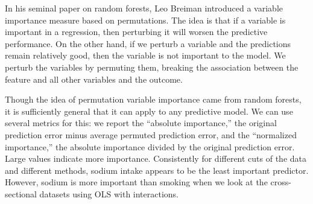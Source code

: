 \documentclass[11pt]{article}\usepackage[]{graphicx}\usepackage[]{color}
\begin{document}
In his seminal paper on random forests, Leo Breiman introduced a variable importance measure based on permutations. 
The idea is that if a variable is important in a regression, then perturbing it will worsen the predictive performance. 
On the other hand, if we perturb a variable and the predictions remain relatively good, then the variable is not important to the model. 
We perturb the variables by permuting them, breaking the association between the feature and all other variables and the outcome.

Though the idea of permutation variable importance came from random forests, it is sufficiently general that it can apply to any predictive model. 
We can use several metrics for this: 
we report the ``absolute importance,'' the original prediction error minus average permuted prediction error, and the ``normalized importance,'' the absolute importance divided by the original prediction error. 
Large values indicate more importance.
Consistently for different cuts of the data and different methods, sodium intake appears to be the least important predictor. 
However, sodium is more important than smoking when we look at the cross-sectional datasets using OLS with interactions.
\end{document}

